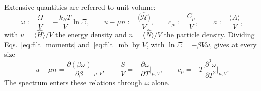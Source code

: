 \documentclass[10pt,a4paper]{article}
\theoremstyle{plain}
\begin{document}
Extensive quantities are referred to unit volume:
\begin{equation}\label{eq:filt_intensive}
  \omega := \frac{\Omega}{V}=-\frac{k_BT}{V}\ln\Xi , \qquad
  u-\mu n:=\frac{\langle\hat{\mathcal H}\rangle}{V} , \qquad
  c_\mu := \frac{C_\mu}{V} , \qquad
  a := \frac{\langle\hat A\rangle}{V} ,
\end{equation}
with $u=\langle\hat H\rangle/V$ the energy density and
$n=\langle\hat N\rangle/V$ the particle density. Dividing
Eqs.~\eqref{eq:filt_moments} and~\eqref{eq:filt_mb} by $V$, with
$\ln\Xi=-\beta V\omega$, gives at every size
\begin{equation}\label{eq:filt_exactV}
  u-\mu n=\frac{\partial(\beta\omega)}{\partial\beta}\bigg|_{\mu, V} ,\qquad
  \frac{S}{V}=-\frac{\partial\omega}{\partial T}\bigg|_{\mu, V} ,
  \qquad
  c_\mu=-T\,\frac{\partial^{2}\omega}{\partial T^{2}}\bigg|_{\mu, V} .
\end{equation}
The spectrum enters these relations through $\omega$ alone.
\end{document}
